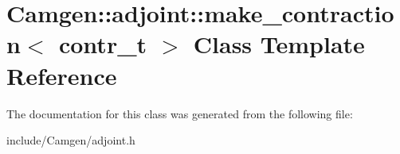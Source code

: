 \hypertarget{a00337}{\section{Camgen\-:\-:adjoint\-:\-:make\-\_\-contraction$<$ contr\-\_\-t $>$ Class Template Reference}
\label{a00337}
}


The documentation for this class was generated from the following file\-:\begin{DoxyCompactItemize}
\item 
include/\-Camgen/adjoint.\-h\end{DoxyCompactItemize}
